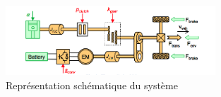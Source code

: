 \begin{figure}[b]
	\begin{center}
	\includegraphics[width=0.7\textwidth]{images/Systeme_VEH.png}
	\caption{Représentation schématique du système}\label{img:Schéma système VEH}
	\end{center}
\end{figure}
\FloatBarrier 

		
		
